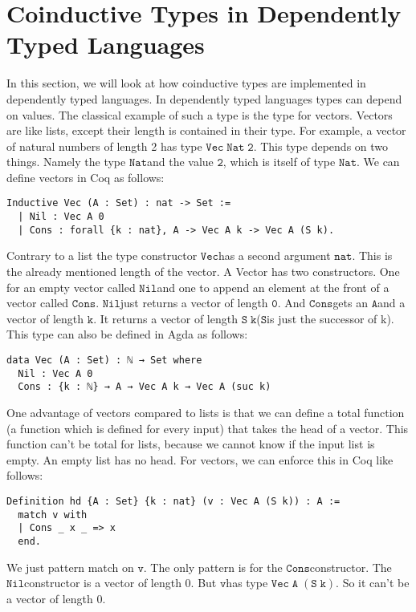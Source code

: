 \documentclass[a4paper,cleardoubleempty,BCOR1cm]{scrbook}
\begin{document}
\chapter{Coinductive Types in Dependently Typed Languages}
\label{sec:orgbdcd039}
In this section, we will look at how coinductive types are implemented in
dependently typed languages. In dependently typed languages types can depend on
values. The classical example of such a type is the type for vectors. Vectors are like
lists, except their length is contained in their type. For example, a vector of
natural numbers of length 2 has type $\mathtt{Vec\;Nat\;2}$. This type depends on two
things. Namely the type $\mathtt{Nat}$\;and the value $\mathtt{2}$, which is itself of type $\mathtt{Nat}$.
We can define vectors in Coq as follows:
\begin{verbatim}
Inductive Vec (A : Set) : nat -> Set :=
  | Nil : Vec A 0
  | Cons : forall {k : nat}, A -> Vec A k -> Vec A (S k).
\end{verbatim}
Contrary to a list the type constructor $\mathtt{Vec}$\;has a second argument $\mathtt{nat}$.
This is the already mentioned length of the vector. A Vector has two
constructors. One for an empty vector called $\mathtt{Nil}$\;and one to append an
element at the front of a vector called $\mathtt{Cons}$. $\mathtt{Nil}$\;just returns a vector
of length $\mathtt{0}$. And $\mathtt{Cons}$\;gets an $\mathtt{A}$\;and a vector of length $\mathtt{k}$. It returns a
vector of length $\mathtt{S\;k}$\;($\mathtt{S}$\;is just the successor of k). This type can also be
defined in Agda as follows:
\begin{verbatim}
data Vec (A : Set) : ℕ → Set where
  Nil : Vec A 0
  Cons : {k : ℕ} → A → Vec A k → Vec A (suc k)
\end{verbatim}
One advantage of vectors compared to lists is that we can define a total function
(a function which is defined for every input) that takes the head of a
vector. This function can't be total for lists, because we cannot know if the
input list is empty. An empty list has no head. For vectors, we can enforce this
in Coq like follows:
\begin{verbatim}
Definition hd {A : Set} {k : nat} (v : Vec A (S k)) : A :=
  match v with
  | Cons _ x _ => x
  end.
\end{verbatim}
We just pattern match on $\mathtt{v}$.  The only pattern is for the $\mathtt{Cons}$\;constructor.  The $\mathtt{Nil}$\;constructor
is a vector of length 0.  But $\mathtt{v}$\;has type $\mathtt{Vec\;A\;(S\;k)}$.  So it can't be a vector of length 0.
\end{document}

